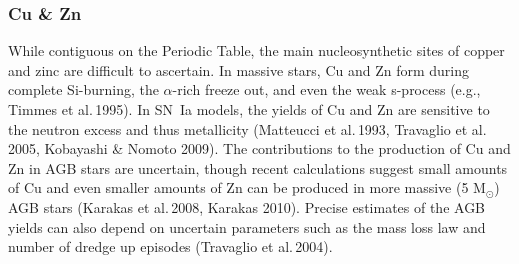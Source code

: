\documentclass{emulateapj}
\newcommand\etal{{\rm et al.\,}}
\begin{document}




\subsubsection{Cu \& Zn}

While contiguous on the Periodic Table, the main nucleosynthetic
sites of copper and zinc are difficult to ascertain.
In massive stars, Cu and Zn form during complete Si-burning, 
the $\alpha$-rich freeze out, and even the weak s-process
(e.g., Timmes \etal 1995).   
In SN~Ia models, the yields of Cu and Zn are sensitive to the 
neutron excess and thus metallicity (Matteucci \etal 1993, 
Travaglio \etal  2005, Kobayashi \& Nomoto 2009).
%
The contributions
to the production of Cu and Zn in AGB stars are uncertain, though
recent calculations suggest small amounts of Cu and even smaller 
amounts of Zn can be produced in more massive (5 M$_\odot$) AGB stars
(Karakas \etal 2008, Karakas 2010).   Precise estimates of the AGB 
yields can also depend on uncertain parameters such as the mass loss 
law and number of dredge up episodes (Travaglio \etal 2004).
\end{document}

